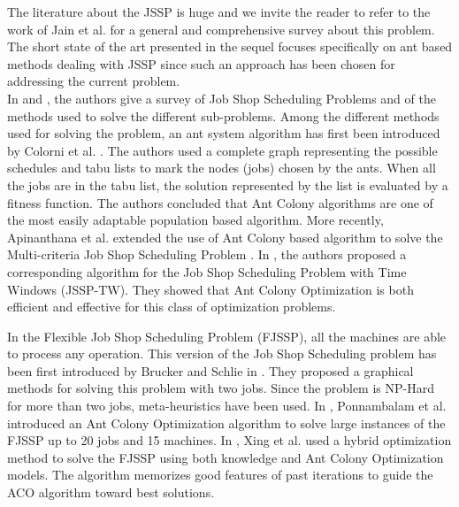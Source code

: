 \documentclass[a4paper,10pt]{article}
\begin{document}
The literature about the JSSP is huge and we invite the reader to refer to the work of Jain et al. \cite{Jain1999} for a general and comprehensive survey about this problem. The short state of the art presented in the sequel focuses specifically on ant based methods dealing with JSSP since such an approach has been chosen for addressing the current problem.\\

In \cite{Jain1999} and \cite{Brucker2010}, the authors give a survey of Job Shop Scheduling Problems and of the methods used to solve the different sub-problems.
Among the different methods used for solving the problem, an ant system algorithm has first been introduced by Colorni et al. \cite{Colorni1994}. The authors used a complete graph representing the possible schedules and tabu lists to mark the nodes (jobs) chosen by the ants. When all the jobs are in the tabu list, the solution represented by the list is evaluated by a fitness function. The authors concluded that Ant Colony algorithms are one of the most easily adaptable population based algorithm. More recently, Apinanthana et al. extended the use of Ant Colony based algorithm to solve the Multi-criteria Job Shop Scheduling Problem \cite{Apinanthana2011}.
In \cite{Huang2008}, the authors proposed a corresponding algorithm for the Job Shop Scheduling Problem with Time Windows (JSSP-TW). They showed that Ant Colony Optimization is both efficient and effective for this class of optimization problems.

In the Flexible Job Shop Scheduling Problem (FJSSP), all the machines are able to process any operation. This version of the Job Shop Scheduling problem has been first introduced by Brucker and Schlie in \cite{Brucker1990}. They proposed a graphical methods for solving this problem with two jobs. Since the problem is NP-Hard for more than two jobs, meta-heuristics have been used. In \cite{Ponnambalam2005}, Ponnambalam et al. introduced an Ant Colony Optimization algorithm to solve large instances of the FJSSP up to 20 jobs and 15 machines. In \cite{Xing2010}, Xing et al. used a hybrid optimization method to solve the FJSSP using both knowledge and Ant Colony Optimization models. The algorithm memorizes good features of past iterations to guide the ACO algorithm toward best solutions.
\end{document}
